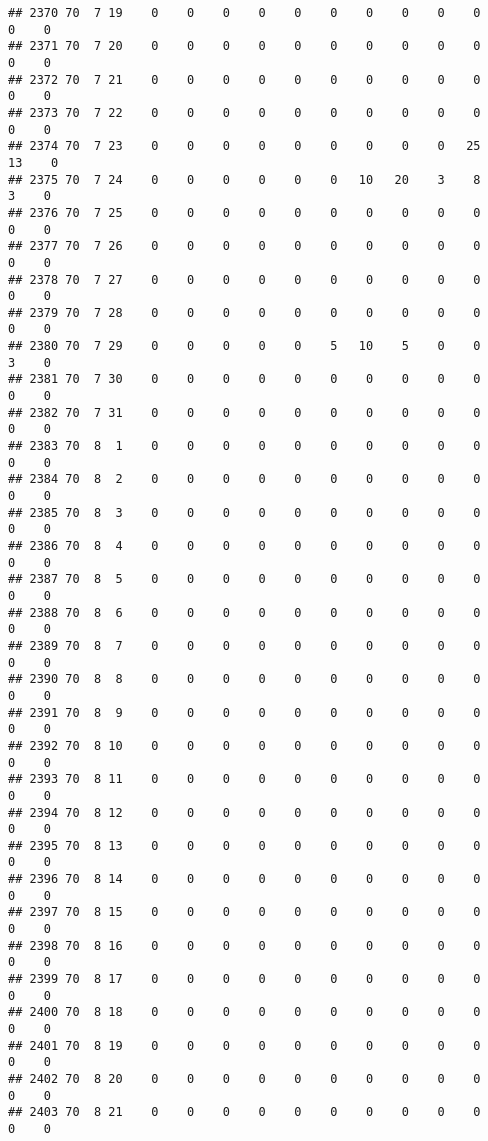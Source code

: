 \documentclass[]{article}
\begin{document}
\begin{verbatim}
## 2370 70  7 19    0    0    0    0    0    0    0    0    0    0    0    0
## 2371 70  7 20    0    0    0    0    0    0    0    0    0    0    0    0
## 2372 70  7 21    0    0    0    0    0    0    0    0    0    0    0    0
## 2373 70  7 22    0    0    0    0    0    0    0    0    0    0    0    0
## 2374 70  7 23    0    0    0    0    0    0    0    0    0   25   13    0
## 2375 70  7 24    0    0    0    0    0    0   10   20    3    8    3    0
## 2376 70  7 25    0    0    0    0    0    0    0    0    0    0    0    0
## 2377 70  7 26    0    0    0    0    0    0    0    0    0    0    0    0
## 2378 70  7 27    0    0    0    0    0    0    0    0    0    0    0    0
## 2379 70  7 28    0    0    0    0    0    0    0    0    0    0    0    0
## 2380 70  7 29    0    0    0    0    0    5   10    5    0    0    3    0
## 2381 70  7 30    0    0    0    0    0    0    0    0    0    0    0    0
## 2382 70  7 31    0    0    0    0    0    0    0    0    0    0    0    0
## 2383 70  8  1    0    0    0    0    0    0    0    0    0    0    0    0
## 2384 70  8  2    0    0    0    0    0    0    0    0    0    0    0    0
## 2385 70  8  3    0    0    0    0    0    0    0    0    0    0    0    0
## 2386 70  8  4    0    0    0    0    0    0    0    0    0    0    0    0
## 2387 70  8  5    0    0    0    0    0    0    0    0    0    0    0    0
## 2388 70  8  6    0    0    0    0    0    0    0    0    0    0    0    0
## 2389 70  8  7    0    0    0    0    0    0    0    0    0    0    0    0
## 2390 70  8  8    0    0    0    0    0    0    0    0    0    0    0    0
## 2391 70  8  9    0    0    0    0    0    0    0    0    0    0    0    0
## 2392 70  8 10    0    0    0    0    0    0    0    0    0    0    0    0
## 2393 70  8 11    0    0    0    0    0    0    0    0    0    0    0    0
## 2394 70  8 12    0    0    0    0    0    0    0    0    0    0    0    0
## 2395 70  8 13    0    0    0    0    0    0    0    0    0    0    0    0
## 2396 70  8 14    0    0    0    0    0    0    0    0    0    0    0    0
## 2397 70  8 15    0    0    0    0    0    0    0    0    0    0    0    0
## 2398 70  8 16    0    0    0    0    0    0    0    0    0    0    0    0
## 2399 70  8 17    0    0    0    0    0    0    0    0    0    0    0    0
## 2400 70  8 18    0    0    0    0    0    0    0    0    0    0    0    0
## 2401 70  8 19    0    0    0    0    0    0    0    0    0    0    0    0
## 2402 70  8 20    0    0    0    0    0    0    0    0    0    0    0    0
## 2403 70  8 21    0    0    0    0    0    0    0    0    0    0    0    0

\end{verbatim}
\end{document}
